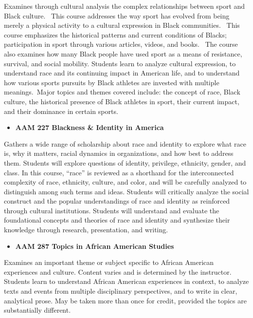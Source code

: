 \documentclass[
  letterpaper,
]{scrbook}
\providecommand{\tightlist}{%
  \setlength{\itemsep}{0pt}\setlength{\parskip}{0pt}}
\begin{document}
Examines through cultural analysis the complex relationships between
sport and Black culture.~ This course addresses the way sport has
evolved from being merely a physical activity to a cultural expression
in Black communities.~ This course emphasizes the historical patterns
and current conditions of Blacks; participation in sport through various
articles, videos, and books.~ The course also examines how many Black
people have used sport as a means of resistance, survival, and social
mobility. Students learn to analyze cultural expression, to understand
race and its continuing impact in American life, and to understand how
various sports pursuits by Black athletes are invested with multiple
meanings.~Major topics and themes covered include: the concept of race,
Black culture, the historical presence of Black athletes in sport, their
current impact, and their dominance in certain sports.

\begin{itemize}
\tightlist
\item
  \textbf{AAM 227 Blackness \& Identity in America}
\end{itemize}

Gathers a wide range of scholarship about race and identity to explore
what race is, why it matters, racial dynamics in organizations, and how
best to address them. Students will explore questions of identity,
privilege, ethnicity, gender, and class. In this course, ``race'' is
reviewed as a shorthand for the interconnected complexity of race,
ethnicity, culture, and color, and will be carefully analyzed to
distinguish among such terms and ideas. Students will critically analyze
the social construct and the popular understandings of race and identity
as reinforced through cultural institutions. Students will understand
and evaluate the foundational concepts and theories of race and identity
and synthesize their knowledge through research, presentation, and
writing.

\begin{itemize}
\tightlist
\item
  \textbf{AAM 287 Topics in African American Studies}
\end{itemize}

Examines an important theme or subject specific to African American
experiences and culture. Content varies and is determined by the
instructor. Students learn to understand African American experiences in
context, to analyze texts and events from multiple disciplinary
perspectives, and to write in clear, analytical prose. May be taken more
than once for credit, provided the topics are substantially different.
\end{document}
